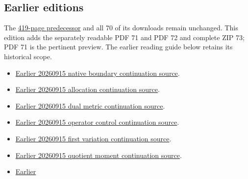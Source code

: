 \documentclass[
]{article}
\providecommand{\tightlist}{%
  \setlength{\itemsep}{0pt}\setlength{\parskip}{0pt}}
\begin{document}
\subsection{Earlier editions}\label{earlier-editions}

The \href{https://doi.org/10.5281/zenodo.22771246}{419-page predecessor}
and all 70 of its downloads remain unchanged. This edition adds the
separately readable PDF 71 and PDF 72 and complete ZIP 73; PDF 71 is the
pertinent preview. The earlier reading guide below retains its
historical scope.

\begin{itemize}
\tightlist
\item
  \href{https://github.com/KokunoYumeto/zeta-function-research-reader/tree/0512b18d5479f3abc24ae654f8ffee4e5d53922e/workbenches/splitzero-tandem/continuations/20260915-native-boundary-continuation}{Earlier
  20260915 native boundary continuation source}.
\item
  \href{https://github.com/KokunoYumeto/zeta-function-research-reader/tree/88cec321ccb455d1906d4abce7dc08bea6c7676d/workbenches/splitzero-tandem/continuations/20260915-allocation-continuation}{Earlier
  20260915 allocation continuation source}.
\item
  \href{https://github.com/KokunoYumeto/zeta-function-research-reader/tree/b4076eb15afd6b036a8de62d67b88eef03efeb50/workbenches/splitzero-tandem/continuations/20260915-dual-metric-continuation}{Earlier
  20260915 dual metric continuation source}.
\item
  \href{https://github.com/KokunoYumeto/zeta-function-research-reader/tree/36b2654e1d3324c6de24e324ec34bb3a98f67103/workbenches/splitzero-tandem/continuations/20260915-operator-control-continuation}{Earlier
  20260915 operator control continuation source}.
\item
  \href{https://github.com/KokunoYumeto/zeta-function-research-reader/tree/af5c17948c24f43494ea76d823322e8b3924b58d/workbenches/splitzero-tandem/continuations/20260915-first-variation-continuation}{Earlier
  20260915 first variation continuation source}.
\item
  \href{https://github.com/KokunoYumeto/zeta-function-research-reader/tree/bf39bac055b76ce755b91401b35570bb84d76d9a/workbenches/splitzero-tandem/continuations/20260915-quotient-moment-continuation}{Earlier
  20260915 quotient moment continuation source}.
\item
  \href{https://github.com/KokunoYumeto/zeta-function-research-reader/tree/dad07e28faa735104ddc0b137521620fc315e6fc/workbenches/splitzero-tandem/continuations/20260914-exterior-kernel-continuation}{Earlier
}
\end{itemize}
\end{document}
